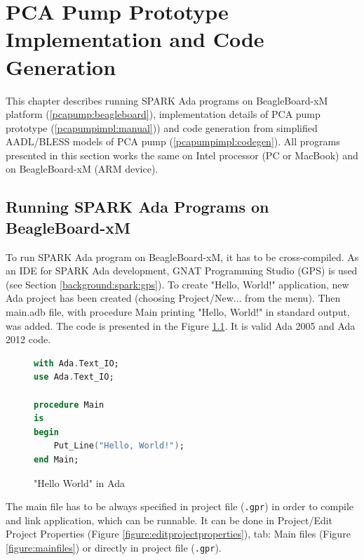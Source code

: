 
\cleardoublepage


\chapter{PCA Pump Prototype Implementation and Code Generation}
\label{pcapumpimpl}

This chapter describes running SPARK Ada programs on BeagleBoard-xM platform (\ref{pcapump:beagleboard}), implementation details of PCA pump prototype (\ref{pcapumpimpl:manual})) and code generation from simplified AADL/BLESS models of PCA pump (\ref{pcapumpimpl:codegen}). All programs presented in this section works the same on Intel processor (PC or MacBook) and on BeagleBoard-xM (ARM device).


\section{Running SPARK Ada Programs on BeagleBoard-xM}
\label{pcapumpimpl:beagleboard}

To run SPARK Ada program on BeagleBoard-xM, it has to be cross-compiled. As an IDE for SPARK Ada development, GNAT Programming Studio (GPS) is used (see Section \ref{background:spark:gps}). To create "Hello, World!" application, new Ada project has been created (choosing Project/New... from the menu). Then main.adb file, with procedure Main printing "Hello, World!" in standard output, was added. The code is presented in the Figure \ref{listing:HelloWorld}. It is valid Ada 2005 and Ada 2012 code.

\begin{figure}[ht]
\singlespacing
\begin{lstlisting}[language=ada, frame=single, gobble=0]
with Ada.Text_IO;
use Ada.Text_IO;

procedure Main
is
begin
    Put_Line("Hello, World!");    
end Main;
\end{lstlisting} 
\doublespacing
\caption{"Hello World" in Ada}
\label{listing:HelloWorld}
\end{figure}


The main file has to be always specified in project file (\lstinline{.gpr}) in order to compile and link application, which can be runnable. It can be done in Project/Edit Project Properties (Figure \ref{figure:editprojectproperties}), tab: Main files (Figure \ref{figure:mainfiles}) or directly in project file (\lstinline{.gpr}).

